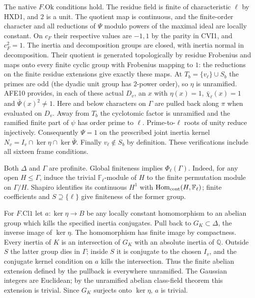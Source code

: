 The native $F.\mathrm{Ok}$ conditions hold. The residue field is
finite of characteristic $\ell$ by HXD1, and $2$ is a unit. The
quotient map is continuous, and the finite-order character and
all reductions of $\Psi$ modulo powers of the maximal ideal are
locally constant. On $c_F$ their respective values are $-1,1$ by
the parity in CVI1, and $c_F^2=1$. The inertia and decomposition
groups are closed, with inertia normal in decomposition. Their
quotient is generated topologically by residue Frobenius and maps
onto every finite cyclic group with Frobenius mapping to $1$:
the reductions on the finite residue extensions give exactly these
maps. At $T_b=\{v_\ell\}\cup S_b$ the primes are odd (the
dyadic unit group has $2$-power order), so $\eta$ is unramified.
AFE10 provides, in each of these actual $D_v$, an $x$ with
$\eta(x)=1$, $\bar\chi_\ell(x)=1$ and $\bar\Psi(x)^2\ne1$.
Here and below characters on $\Gamma$ are pulled back along $\pi$
when evaluated on $D_v$. Away from $T_b$ the cyclotomic factor
is unramified and the ramified finite part of $\psi$ has order
prime to $\ell$. Prime-to-$\ell$ roots of unity reduce injectively.
Consequently $\Psi=1$ on the prescribed joint inertia kernel
$N_v=I_v\cap\ker\eta\cap\ker\bar\Psi$. Finally $v_\ell\notin S_b$
by definition. These verifications include all sixteen frame conditions.

Both $\Delta$ and $\Gamma$ are profinite. Global finiteness implies
$\Phi_\ell(\Gamma)$. Indeed, for any open $H\le\Gamma$, induce the
trivial $\mathbb F_\ell$-module of $H$ to the finite permutation
module on $\Gamma/H$. Shapiro identifies its continuous $H^1$ with
$\operatorname{Hom}_{\rm cont}(H,\mathbb F_\ell)$; finite coefficients
and $S\supseteq\{\ell\}$ give finiteness of the former group.

For $F.\mathrm{Cl1}$ let $a:\ker\eta\to B$ be any locally constant
homomorphism to an abelian group which kills the specified inertia
conjugates. Pull back to $G_K\subset\Delta$, the inverse image of
$\ker\eta$. The homomorphism has finite image by compactness.
Every inertia of $K$ is an intersection of $G_K$ with an absolute
inertia of $\mathbb Q$. Outside $S$ the latter group dies in
$\Gamma$; inside $S$ it is conjugate to the chosen $I_v$, and the
conjugate kernel condition on $a$ kills the intersection. Thus the
finite abelian extension defined by the pullback is everywhere
unramified. The Gaussian integers are Euclidean; by the unramified
abelian class-field theorem this extension is trivial. Since
$G_K$ surjects onto $\ker\eta$, $a$ is trivial.

